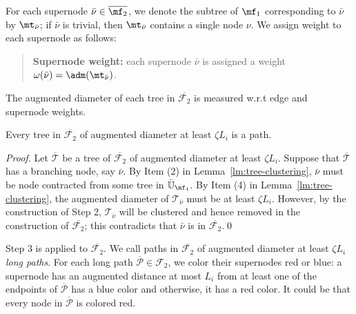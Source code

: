 For each supernode $\bar{\nu}\in \overline{\mf_2}$, we denote the subtree of $\mf_1$ corresponding to $\bar{\nu}$ by $\mt_{\bar{\nu}}$; if $\bar{\nu}$ is trivial, then $\mt_{\bar{\nu}}$ contains a single node $\nu$. We assign weight to each supernode as follows:
\begin{quote}
	\textbf{Supernode weight:} each supernode $\bar{\nu}$ is assigned a weight $\omega(\bar{\nu}) = \adm(\mt_{\bar{\nu}})$.
\end{quote}

The augmented diameter of each tree in $\overline{\mathcal{F}_2}$ is measured w.r.t edge and supernode weights.  

\begin{claim}\label{clm:BarF2-structure} Every tree in $\overline{\mathcal{F}_2}$ of augmented diameter at least $\zeta L_i$ is a path.
\end{claim}
\begin{proof}
	Let $\overline{\mathcal{T}}$ be a tree of $\overline{\mathcal{F}_2}$ of augmented diameter at least $\zeta L_i$. Suppose that $\overline{\mathcal{T}}$ has a branching node, say $\bar{\nu}$. By Item (2) in Lemma~\ref{lm:tree-clustering}, $\bar{\nu}$ must be node contracted from some tree in $\bar{\mathbb{U}}_{\mf_1}$. By Item (4) in Lemma~\ref{lm:tree-clustering}, the augmented diameter of  $\mathcal{T}_{\bar{\nu}}$ must be at least $\zeta L_i$. However, by the construction of Step 2, $\mathcal{T}_{\bar{\nu}}$ will be clustered and hence removed in the construction of $\overline{\mathcal{F}_2}$; this contradicts that $\bar{\nu}$ is in $\overline{\mathcal{F}_2}$.\qed
\end{proof}


Step 3 is applied to $\overline{\mathcal{F}_2}$.  We call  paths in $\overline{\mathcal{F}_2}$ of augmented diameter  at least $\zeta L_i$ \emph{long paths}.  For each long path $\overline{\mathcal{P}} \in \mathcal{F}_2$, we color their supernodes red or blue:  a supernode has an augmented distance at most $L_i$ from at least one of the endpoints of $\overline{\mathcal{P}}$ has a blue color and otherwise, it has  a red color. It could be that every node in $\overline{\mathcal{P}}$ is colored red.


